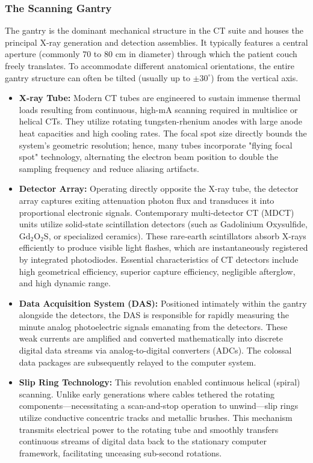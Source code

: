 \subsubsection{The Scanning Gantry}
The gantry is the dominant mechanical structure in the CT suite and houses the principal X-ray generation and detection assemblies. It typically features a central aperture (commonly $70$ to $80\text{ cm}$ in diameter) through which the patient couch freely translates. To accommodate different anatomical orientations, the entire gantry structure can often be tilted (usually up to $\pm 30^\circ$) from the vertical axis.
\begin{itemize}
    \item \textbf{X-ray Tube:} Modern CT tubes are engineered to sustain immense thermal loads resulting from continuous, high-mA scanning required in multislice or helical CTs. They utilize rotating tungsten-rhenium anodes with large anode heat capacities and high cooling rates. The focal spot size directly bounds the system's geometric resolution; hence, many tubes incorporate "flying focal spot" technology, alternating the electron beam position to double the sampling frequency and reduce aliasing artifacts.
    \item \textbf{Detector Array:} Operating directly opposite the X-ray tube, the detector array captures exiting attenuation photon flux and transduces it into proportional electronic signals. Contemporary multi-detector CT (MDCT) units utilize solid-state scintillation detectors (such as Gadolinium Oxysulfide, $\text{Gd}_2\text{O}_2\text{S}$, or specialized ceramics). These rare-earth scintillators absorb X-rays efficiently to produce visible light flashes, which are instantaneously registered by integrated photodiodes. Essential characteristics of CT detectors include high geometrical efficiency, superior capture efficiency, negligible afterglow, and high dynamic range.
    \item \textbf{Data Acquisition System (DAS):} Positioned intimately within the gantry alongside the detectors, the DAS is responsible for rapidly measuring the minute analog photoelectric signals emanating from the detectors. These weak currents are amplified and converted mathematically into discrete digital data streams via analog-to-digital converters (ADCs). The colossal data packages are subsequently relayed to the computer system.
    \item \textbf{Slip Ring Technology:} This revolution enabled continuous helical (spiral) scanning. Unlike early generations where cables tethered the rotating components—necessitating a scan-and-stop operation to unwind—slip rings utilize conductive concentric tracks and metallic brushes. This mechanism transmits electrical power to the rotating tube and smoothly transfers continuous streams of digital data back to the stationary computer framework, facilitating unceasing sub-second rotations.

\end{itemize}
